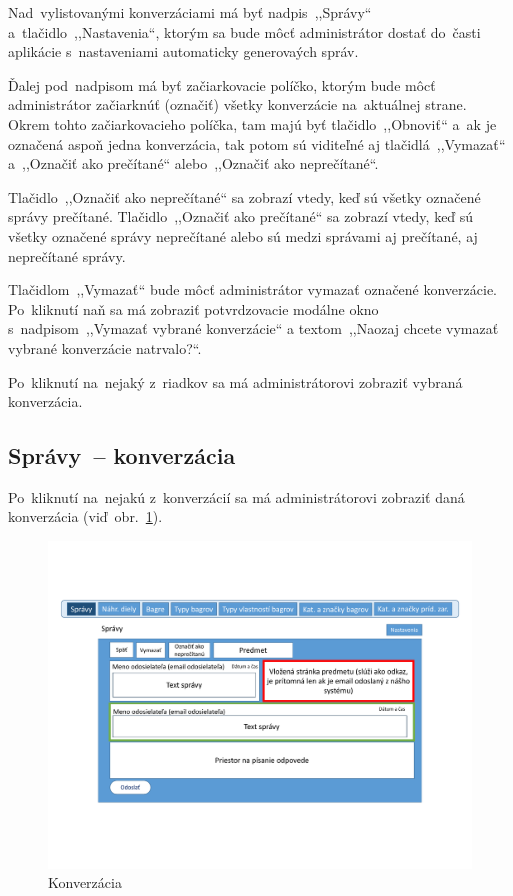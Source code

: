 Nad~vylistovanými konverzáciami má byť nadpis~,,Správy`` a~tlačidlo~,,Nastavenia``, ktorým sa bude môcť administrátor dostať do~časti aplikácie s~nastaveniami automaticky generovaých správ. 

Ďalej pod~nadpisom má byť začiarkovacie políčko, ktorým bude môcť administrátor začiarknúť (označiť) všetky konverzácie na~aktuálnej strane. Okrem tohto začiarkovacieho políčka, tam majú byť tlačidlo~,,Obnoviť`` a~ak je označená aspoň jedna konverzácia, tak potom sú viditeľné aj tlačidlá~,,Vymazať`` a~,,Označiť ako prečítané`` alebo~,,Označiť ako neprečítané``.

Tlačidlo~,,Označiť ako neprečítané`` sa zobrazí vtedy, keď sú všetky označené správy prečítané. Tlačidlo~,,Označiť ako prečítané`` sa zobrazí vtedy, keď sú všetky označené správy neprečítané alebo sú medzi správami aj prečítané, aj neprečítané správy.

Tlačidlom~,,Vymazať`` bude môcť administrátor vymazať označené konverzácie. Po~kliknutí naň sa má zobraziť potvrdzovacie modálne okno s~nadpisom~,,Vymazať vybrané konverzácie`` a textom~,,Naozaj chcete vymazať vybrané konverzácie natrvalo?``.

Po~kliknutí na~nejaký z~riadkov sa má administrátorovi zobraziť vybraná konverzácia.

\subsection{Správy~-- konverzácia}

Po~kliknutí na~nejakú z~konverzácií sa má administrátorovi zobraziť daná konverzácia (viď~obr.~\ref{message}).

\begin{figure}[H]\centering
\includegraphics[width=140mm]{../img/UI concept/message}
\caption{Konverzácia}
\label{message}
\end{figure}


